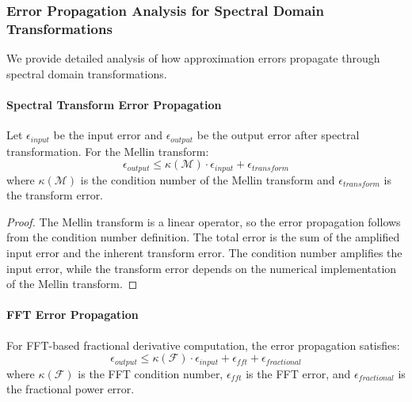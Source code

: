 \subsubsection{Error Propagation Analysis for Spectral Domain Transformations}

We provide detailed analysis of how approximation errors propagate through spectral domain transformations.

\paragraph{Spectral Transform Error Propagation}

\begin{theorem}
Let $\epsilon_{input}$ be the input error and $\epsilon_{output}$ be the output error after spectral transformation. For the Mellin transform:
\begin{equation}
\epsilon_{output} \leq \kappa(\mathcal{M}) \cdot \epsilon_{input} + \epsilon_{transform}
\end{equation}
where $\kappa(\mathcal{M})$ is the condition number of the Mellin transform and $\epsilon_{transform}$ is the transform error.
\end{theorem}

\begin{proof}
The Mellin transform is a linear operator, so the error propagation follows from the condition number definition. The total error is the sum of the amplified input error and the inherent transform error. The condition number amplifies the input error, while the transform error depends on the numerical implementation of the Mellin transform.
\end{proof}

\paragraph{FFT Error Propagation}

\begin{theorem}
For FFT-based fractional derivative computation, the error propagation satisfies:
\begin{equation}
\epsilon_{output} \leq \kappa(\mathcal{F}) \cdot \epsilon_{input} + \epsilon_{fft} + \epsilon_{fractional}
\end{equation}
where $\kappa(\mathcal{F})$ is the FFT condition number, $\epsilon_{fft}$ is the FFT error, and $\epsilon_{fractional}$ is the fractional power error.
\end{theorem}

